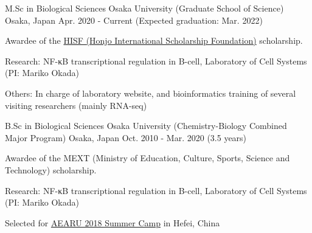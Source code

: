 

\begin{cventries}

  \cventry
  {M.Sc in Biological Sciences} %
  {Osaka University (Graduate School of Science)} %
  {Osaka, Japan} %
  {Apr. 2020 - Current (Expected graduation: Mar. 2022)} %
  {
    \begin{cvitems} %
      \item {Awardee of the \href{https://www.hisf.or.jp/en/}{HISF (Honjo International Scholarship Foundation)} scholarship.} 
      \item {Research: NF-κB transcriptional regulation in B-cell, Laboratory of Cell Systems (PI: Mariko Okada)}
      \item {Others: In charge of laboratory website, and bioinformatics training of several visiting researchers (mainly RNA-seq)}
    \end{cvitems}
  }

  \cventry
  {B.Sc in Biological Sciences} %
  {Osaka University (Chemistry-Biology Combined Major Program)}  %
  {Osaka, Japan} %
  {Oct. 2010 - Mar. 2020 (3.5 years)} %
  {
    \begin{cvitems} %
      \item {Awardee of the MEXT (Ministry of Education, Culture, Sports, Science and Technology) scholarship.}
      \item {Research: NF-κB transcriptional regulation in B-cell, Laboratory of Cell Systems (PI: Mariko Okada)}
      \item {Selected for \href{http://www.aearu.com/camp_data/AEARU\%202018\%20Student\%20Summer\%20Camp\%20Activity\%20Report.pdf}{AEARU 2018 Summer Camp} in Hefei, China }
    \end{cvitems}
  }


\end{cventries}
